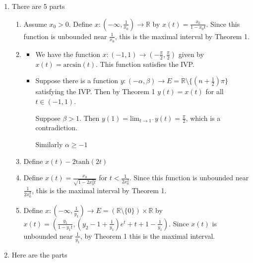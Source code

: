 \documentclass{article}
\begin{document}
    \begin{enumerate}
        \item There are 5 parts
    
        \begin{enumerate}
            \item Assume $x_0>0$. Define $x:(-\infty,\frac{1}{x_0}) \to \mathbb{R}$ by $x(t)=\frac{x_0}{1-x_0t}$. Since this function is unbounded near $\frac{1}{x_0}$, this is the maximal interval by Theorem 1.

            \item 

            \begin{itemize}
                
                \item We have the function $x:(-1,1) \to (-\frac{\pi}{2},\frac{\pi}{2})$ given by $x(t)=\text{arcsin}(t)$. This function satisfies the IVP.

                \item Suppose there is a function $y:(-\alpha,\beta) \to E=\mathbb{R}\setminus\{(n+\frac{1}{2})\pi\}$ satisfying the IVP. Then by Theorem 1 $y(t)=x(t)$ for all $t \in (-1,1)$.

                Suppose $\beta>1$. Then $y(1)=\text{lim}_{t \to 1^-}y(t)=\frac{\pi}{2}$, which is a contradiction.

                Similarly $\alpha\geq -1$
            
            \end{itemize}
            
            \item Define $x(t)-2\text{tanh}(2t)$

            \item Define $x(t)=\frac{x_0}{\sqrt{1-2x_0^2t}}$ for $t<\frac{1}{2x_0^2}$. Since this function is unbounded near $\frac{1}{2x_0^2}$, this is the maximal interval by Theorem 1.

            \item Define $x:(-\infty,\frac{1}{y_1}) \to E = (\mathbb{R}\setminus\{0\}) \times \mathbb{R}$ by $x(t)=(\frac{y_1}{1-y_1t},(y_2-1+\frac{1}{y_1})e^t+t+1-\frac{1}{y_1})$. Since $x(t)$ is unbounded near $\frac{1}{y_1}$, by Theorem 1 this is the maximal interval.
        
        \end{enumerate}

    \item Here are the parts
    

\end{enumerate}
\end{document}
